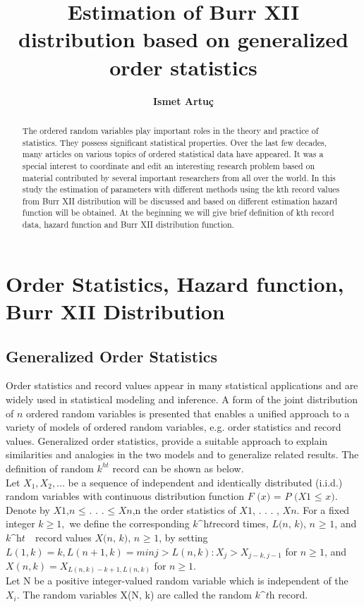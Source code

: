 \documentclass[12pt,a4paper]{article}
\title{\textbf{Estimation of Burr XII distribution based on generalized order statistics}}
\author{\textbf{Ismet Artuç}}
\date{}
\begin{document}
\maketitle %




\tableofcontents %

\newpage
\begin{abstract}
The ordered random variables play important roles in the theory and practice of statistics. They possess significant statistical properties. Over the last few decades, many articles on various topics of ordered statistical data have appeared. It was a special interest to coordinate and edit an interesting research problem based on material contributed by several important researchers from all over the world. In this study the estimation of parameters with different methods using the kth record values from Burr XII distribution will be discussed and based on different estimation hazard function will be obtained. At the beginning we will give brief definition of kth record data, hazard function and Burr XII distribution function.  
\end{abstract}
\newpage

\section{\Generalized Order Statistics, Hazard function, Burr XII Distribution}
\subsection{Generalized Order Statistics}
Order statistics and record values appear in many statistical applications and are widely used in statistical modeling and inference. A form of the joint distribution of $ \textit{n} $ ordered random variables is presented that enables a unified approach to a variety of models of ordered random variables, e.g. order statistics and record values. Generalized order statistics, provide a suitable approach to explain similarities and analogies in the two models and to generalize related results. The definition of random  $k^{ht}$ record  can  be  shown  as  below.\\
Let $ X_{1}, X_{2}, . . .$ be a sequence of independent and identically distributed (i.i.d.) random variables with continuous distribution function  $\textit{F (x) = P (X{1} ≤ x)}$. Denote by $\textit{X{1,n} ≤ . . . ≤ X{n}}$,n the order statistics of   $\textit{X{1}, . . . , X{n}}.$ For a fixed integer  $\textit{k} ≥ 1,$ we define the corresponding  $\textit{k^{ht}}$record times, $\textit{{L(n, k), n ≥ 1}}$, and  $\textit{k^{ht} }$ record values $\textit{{X(n, k), n ≥ 1}}$, by setting$L(1, k) = k,	L(n + 1, k) = min{j > L(n, k) : X_{j} > X_{j-k,j-1}}$  	for $n ≥ 1 $, and
$ X(n, k) = X_{L(n,k)−k+1,L(n,k)} $	for	  $n ≥ 1.$\\
Let N be a positive integer-valued random variable which is independent of the $ X_{i}. $ The random variables X(N, k) are called the random $\textit{k^{th}} $ record.
\end{document}

